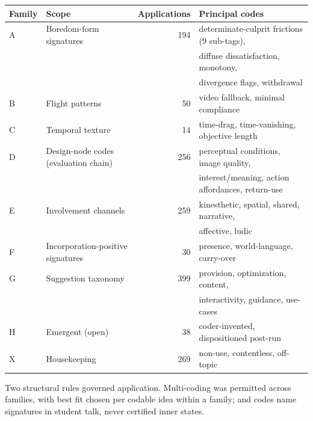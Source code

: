 \begin{center}
\begin{tabular}{llrl}
\hline
Family & Scope & Applications & Principal codes \\
\hline
A & Boredom-form signatures & 194 & determinate-culprit frictions (9 sub-tags), \\
  &                          &     & diffuse dissatisfaction, monotony, \\
  &                          &     & divergence flags, withdrawal \\
B & Flight patterns & 50 & video fallback, minimal compliance \\
C & Temporal texture & 14 & time-drag, time-vanishing, objective length \\
D & Design-node codes (evaluation chain) & 256 & perceptual conditions, image quality, \\
  &                          &     & interest/meaning, action affordances, return-use \\
E & Involvement channels & 259 & kinesthetic, spatial, shared, narrative, \\
  &                          &     & affective, ludic \\
F & Incorporation-positive signatures & 30 & presence, world-language, carry-over \\
G & Suggestion taxonomy & 399 & provision, optimization, content, \\
  &                          &     & interactivity, guidance, use-cases \\
H & Emergent (open) & 38 & coder-invented, dispositioned post-run \\
X & Housekeeping & 269 & non-use, contentless, off-topic \\
\hline
\end{tabular}
\end{center}


Two structural rules governed application. Multi-coding was permitted across
families, with best fit chosen per codable idea within a family; and codes
name signatures in student talk, never certified inner states.

